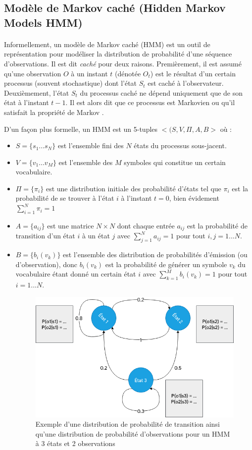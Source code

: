 	\subsection{Modèle de Markov caché (Hidden Markov Models HMM)}
	\paragraph{}
	Informellement, un modèle de Markov caché (HMM) est un outil de représentation pour modéliser la distribution de probabilité d'une séquence d'observations. Il est dit \textit{caché} pour deux raisons. Premièrement, il est assumé qu'une observation $O$ à un instant $t$ (dénotée $O_t$)  est le résultat d'un certain processus (souvent stochastique) dont l'état $S_t$ est caché à l'observateur. Deuxièmement, l'état $S_t$ du processus caché ne dépend uniquement que de son état à l'instant $t-1$. Il est alors dit que ce processus est Markovien ou qu'il satisfait la propriété de Markov \cite{hmm_intro,markov_process}.
	\par D'un façon plus formelle, un HMM est un 5-tuples $<(S,V,\Pi,A,B>$ \cite{hmm_formal} où :
	\begin{itemize}
		\item $S = \lbrace s_1 ... s_N \rbrace$ est l'ensemble fini des $N$ états du processus sous-jacent.
		\item $V = \lbrace v_1 ... v_M \rbrace$ est l'ensemble des $M$ symboles qui constitue un certain vocabulaire.
		\item $\Pi = \lbrace \pi_i \rbrace$ est une distribution initiale des probabilité d'états tel que $\pi_i$ est la probabilité de se trouver à l'état $i$ à l'instant $t=0$, bien évidement $\sum_{i=1}^{N} \pi_i = 1$ 
		\item $A=\lbrace a_{ij} \rbrace$ est une matrice $N \times N$ dont chaque entrée $a_{ij}$ est la probabilité de transition d'un état $i$ à un état $j$ avec $\sum_{j=1}^{N} a_{ij} = 1$ pour tout $i,j = 1...N$.
		\item $B=\lbrace b_i(v_k)\rbrace$ est l'ensemble des distribution de probabilités d'émission (ou d'observation), donc $b_i(v_k)$ est la probabilité de générer un symbole $v_k$ du vocabulaire étant donné un certain état $i$ avec $\sum_{k=1}^{M} b_{i}(v_k) = 1$ pour tout $i= 1...N$. 
		
		\begin{figure}[H]
			\centering
			\includegraphics[width=0.65\linewidth]{images/notions/hmm.png}
			\caption{Exemple d'une distribution de probabilité de transition ainsi qu'une distribution de probabilité d'observations pour un HMM à 3 états et 2 observations }
			\label{hmm_process}
		\end{figure}
	\end{itemize}
